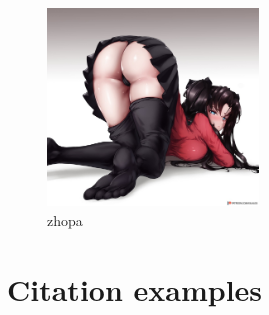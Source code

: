 \documentclass{article}
\begin{document}
\begin{figure}[H]
  \centering
    \includegraphics[width=0.5\textwidth]{./pictures/rin.jpg}
    \caption[zhopa]{zhopa}\label{fig:zhopa}
\end{figure}


\section{Citation examples}
\cite{Zhong2018}~\cite{Bartoli2016}~\cite{Bartoli2018}~\cite{Tariq2024}




\end{document}
